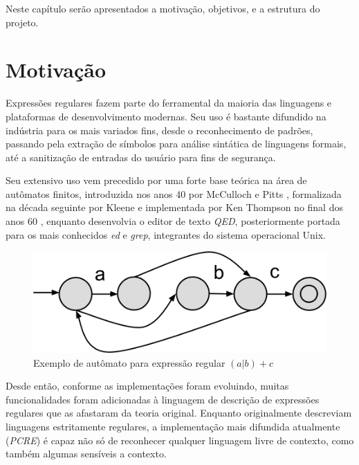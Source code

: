 \documentclass[a4paper,12pt,oneside,onecolumn]{uerj}
\begin{document}
Neste capítulo serão apresentados a motivação, objetivos, e a estrutura do projeto.

\section{Motivação}

Expressões regulares fazem parte do ferramental da maioria das linguagens e plataformas de desenvolvimento modernas. Seu uso é bastante difundido na indústria para os mais variados fins, desde o reconhecimento de padrões, passando pela extração de símbolos para análise sintática de linguagens formais, até a sanitização de entradas do usuário para fins de segurança.

Seu extensivo uso vem precedido por uma forte base teórica na área de autômatos finitos, introduzida nos anos 40 por McCulloch e Pitts \cite{bib:McCulloch43}, formalizada na década seguinte por Kleene \cite{bib:Kleene56} e implementada por Ken Thompson no final dos anos 60 \cite{bib:Thompson68}, enquanto desenvolvia o editor de texto \emph{QED}, posteriormente portada para os mais conhecidos \emph{ed} e \emph{grep}, integrantes do sistema operacional Unix.

\begin{figure}[ht]
  \centering
  \includegraphics[scale=0.25]{figures/exemplo_automato.png}
  \caption{Exemplo de autômato para expressão regular $(a|b)+c$}
\end{figure}

Desde então, conforme as implementações foram evoluindo, muitas funcionalidades foram adicionadas à linguagem de descrição de expressões regulares que as afastaram da teoria original. Enquanto originalmente descreviam linguagens estritamente regulares, a implementação mais difundida atualmente (\emph{PCRE}) é capaz não só de reconhecer qualquer linguagem livre de contexto, como também algumas sensíveis a contexto. \cite{bib:Nikita12}
\end{document}
